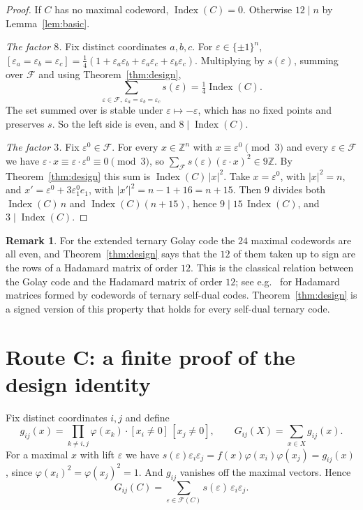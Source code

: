 \documentclass[11pt]{amsart}
\theoremstyle{definition}
\newtheorem{remark}[theorem]{Remark}
\newcommand{\Z}{\mathbb{Z}}
\newcommand{\Index}{\operatorname{Index}}
\newcommand{\cF}{\mathcal{F}}
\begin{document}
\begin{proof}
If $C$ has no maximal codeword, $\Index(C)=0$. Otherwise $12\mid n$ by Lemma~\ref{lem:basic}.

\emph{The factor $8$.} Fix distinct coordinates $a,b,c$. For $\varepsilon\in\{\pm1\}^n$,
$[\varepsilon_a=\varepsilon_b=\varepsilon_c]=\tfrac14(1+\varepsilon_a\varepsilon_b+\varepsilon_a\varepsilon_c
+\varepsilon_b\varepsilon_c)$. Multiplying by $s(\varepsilon)$, summing over $\cF$ and using
Theorem~\ref{thm:design},
\[
  \sum_{\varepsilon\in\cF,\ \varepsilon_a=\varepsilon_b=\varepsilon_c}s(\varepsilon)=\tfrac14\Index(C).
\]
The set summed over is stable under $\varepsilon\mapsto-\varepsilon$, which has no fixed points
and preserves $s$. So the left side is even, and $8\mid\Index(C)$.

\emph{The factor $3$.} Fix $\varepsilon^0\in\cF$. For every $x\in\Z^n$ with $x\equiv\varepsilon^0
\pmod3$ and every $\varepsilon\in\cF$ we have $\varepsilon\cdot x\equiv\varepsilon\cdot\varepsilon^0
\equiv0\pmod3$, so $\sum_{\cF}s(\varepsilon)(\varepsilon\cdot x)^2\in9\Z$. By
Theorem~\ref{thm:design} this sum is $\Index(C)\,|x|^2$. Take $x=\varepsilon^0$, with $|x|^2=n$, and
$x'=\varepsilon^0+3\varepsilon^0_1e_1$, with $|x'|^2=n-1+16=n+15$. Then $9$ divides both
$\Index(C)\,n$ and $\Index(C)(n+15)$, hence $9\mid15\,\Index(C)$, and $3\mid\Index(C)$.
\end{proof}

\begin{remark}\label{rem:golay}
For the extended ternary Golay code the $24$ maximal codewords are all even, and
Theorem~\ref{thm:design} says that the $12$ of them taken up to sign are the rows of a Hadamard
matrix of order $12$. This is the classical relation between the Golay code and the Hadamard matrix
of order $12$; see e.g.\ \cite{AHM} for Hadamard matrices formed by codewords of ternary self-dual
codes. Theorem~\ref{thm:design} is a signed version of this property that holds for every
self-dual ternary code.
\end{remark}

\section{Route C: a finite proof of the design identity}\label{sec:C}

Fix distinct coordinates $i,j$ and define
\[
  g_{ij}(x)=\prod_{k\ne i,j}\varphi(x_k)\cdot[x_i\ne0]\,[x_j\ne0],\qquad G_{ij}(X)=\sum_{x\in X}g_{ij}(x).
\]
For a maximal $x$ with lift $\varepsilon$ we have $s(\varepsilon)\varepsilon_i\varepsilon_j
=f(x)\varphi(x_i)\varphi(x_j)=g_{ij}(x)$, since $\varphi(x_i)^2=\varphi(x_j)^2=1$. And $g_{ij}$
vanishes off the maximal vectors. Hence
\[
  G_{ij}(C)=\sum_{\varepsilon\in\cF(C)}s(\varepsilon)\,\varepsilon_i\varepsilon_j .
\]
\end{document}
